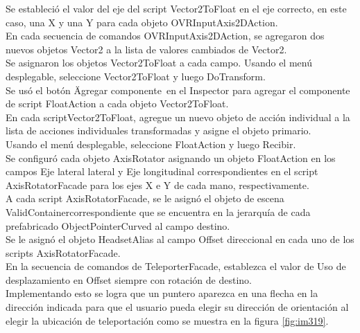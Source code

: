 Se estableció el valor del eje del script Vector2ToFloat en el eje correcto, en este caso, una X y una Y para cada objeto OVRInputAxis2DAction.\\
En cada secuencia de comandos OVRInputAxis2DAction, se agregaron dos nuevos objetos Vector2 a la lista de valores cambiados de Vector2.\\
Se asignaron los objetos Vector2ToFloat a cada campo. Usando el menú desplegable, seleccione Vector2ToFloat y luego DoTransform.\\
Se us\'o el botón \"Agregar componente\ en el Inspector para agregar el componente de script FloatAction a cada objeto Vector2ToFloat.\\
En cada scriptVector2ToFloat, agregue un nuevo objeto de acción individual a la lista de acciones individuales transformadas y asigne el objeto primario.\\
Usando el menú desplegable, seleccione FloatAction y luego Recibir.\\
Se configuró cada objeto AxisRotator asignando un objeto FloatAction en los campos Eje lateral lateral y Eje longitudinal correspondientes en el script AxisRotatorFacade 
para los ejes X e Y de cada mano, respectivamente.\\
A cada script AxisRotatorFacade, se le asign\'o el objeto de escena ValidContainercorrespondiente que se encuentra en la jerarqu\'ia de cada prefabricado ObjectPointerCurved 
al campo destino.\\
Se le asign\'o el objeto HeadsetAlias al campo Offset direccional en cada uno de los scripts AxisRotatorFacade.\\
En la secuencia de comandos de TeleporterFacade, establezca el valor de Uso de desplazamiento en Offset siempre con rotación de destino.\\
Implementando esto se logra que un puntero aparezca en una flecha en la dirección indicada para que el usuario pueda elegir su dirección de orientación al 
elegir la ubicación de teleportación como se muestra en la figura \ref{fig:im319}.\\

